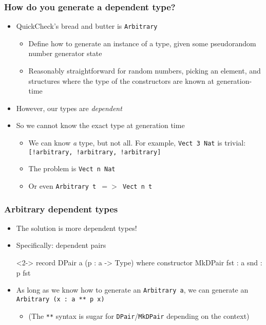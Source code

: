 \documentclass[compress,handout]{beamer}
\begin{document}
\begin{frame}
  \frametitle{How do you generate a dependent type?}

  \begin{itemize}
    \item<1-> QuickCheck's bread and butter is \texttt{Arbitrary}
    \begin{itemize}
      \item<2-> Define how to generate an instance of a type, given some
            pseudorandom number generator state
      \item<3-> Reasonably straightforward for random numbers, picking an
                element, and structures where the type of the constructors are
                known at generation-time
    \end{itemize}
    \item<3-> However, our types are \textit{dependent}
    \item<4-> So we cannot know the exact type at generation time
    \begin{itemize}
      \item<5-> We can know \textit{a} type, but not all. For example,
                \texttt{Vect 3 Nat} is trivial: \texttt{[!arbitrary, !arbitrary,
                !arbitrary]}
      \item<6-> The problem is \texttt{Vect n Nat}
      \item<7-> Or even \texttt{Arbitrary t $=>$ Vect n t}
    \end{itemize}
  \end{itemize}

\end{frame}


\begin{frame}[fragile]
  \frametitle{Arbitrary dependent types}

  \begin{itemize}
    \item<1-> The solution is more dependent types!
    \item<2-> Specifically: dependent pairs

    \vspace*{-6mm}
    \begin{idrislisting}<2->
record DPair a (p : a -> Type) where
  constructor MkDPair
  fst : a
  snd : p fst
    \end{idrislisting}
    \vspace*{-3mm}

    \item<3-> As long as we know how to generate an {\textasciigrave
              \texttt{Arbitrary a}\textasciigrave}, we can generate an
              {\textasciigrave\texttt{Arbitrary (x : a ** p x)}\textasciigrave}
    \begin{itemize}
      \item<3-> (The \texttt{**} syntax is sugar for
                \texttt{DPair}/\texttt{MkDPair} depending on the context)
    \end{itemize}
  \end{itemize}

\end{frame}
\end{document}
